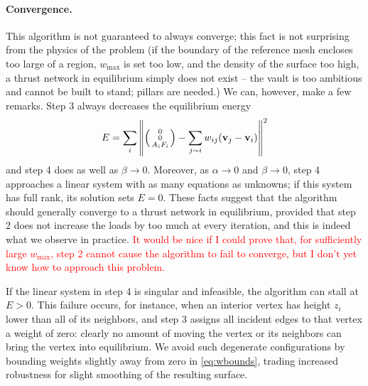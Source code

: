 \documentclass[annual]{acmsiggraph}
\makeatletter
\def\Forcevector{\Big(\mbox{\scriptsize
	\def\arraystretch{0.8}\begin{tabular}{@{\,}c@{\,}}
	0 \\ 0 \\ $A_i F_i$
	\end{tabular}}\Big)}
\newcommand{\todo}[1]{\textcolor{red}{#1}}
\makeatother
\begin{document}
\paragraph{Convergence.}
This algorithm is not guaranteed to always converge; this fact is not surprising from the physics of the problem (if the boundary of the reference mesh encloses too large of a region, $w_{\max}$ is set too low, and the density of the surface too high, a thrust network in equilibrium simply does not exist -- the vault is too ambitious and cannot be built to stand; pillars are needed.) We can, however, make a few remarks. Step 3 always decreases the equilibrium energy 
$$E=\sum_i \left\| \Forcevector - \sum_{j\sim i} w_{ij} (\vw_j - \vw_i)\right\|^2$$
and step 4 does as well as $\beta \to 0$. Moreover, as $\alpha \to 0$ and $\beta \to 0$, step 4 approaches a linear system with as many equations as unknowns; if this system has full rank, its solution sets $E=0$. These facts suggest that the algorithm should generally converge to a thrust network in equilibrium, provided that step 2 does not increase the loads by too much at every iteration, and this is indeed what we observe in practice.  \todo{It would be nice if I could prove that, for sufficiently large $w_{\textrm{max}}$, step 2 cannot cause the algorithm to fail to converge, but I don't yet know how to approach this problem.}

If the linear system in step 4 is singular and infeasible, the algorithm can stall at $E > 0$. This failure occurs, for instance, when an interior vertex has height $z_i$ lower than all of its neighbors, and step 3 assigns all incident edges to that vertex a weight of zero: clearly no amount of moving the vertex or its neighbors can bring the vertex into equilibrium. We avoid such degenerate configurations by bounding weights slightly away from zero in \eqref{eq:wbounds}, trading increased robustness for slight smoothing of the resulting surface.
\end{document}
